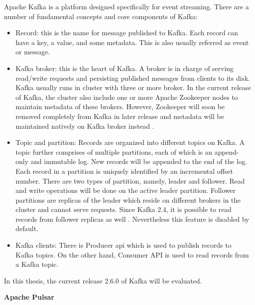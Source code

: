 Apache Kafka is a platform designed specifically for event streaming. There are a number of fundamental concepts and core components of Kafka:
\begin{itemize}
	\item Record: this is the name for message published to Kafka. Each record can have a key, a value, and some metadata. This is also usually referred as event or message.
	\item Kafka broker: this is the heart of Kafka. A broker is in charge of serving read/write requests and persisting published messages from clients to its disk. Kafka usually runs in cluster with three or more broker. In the current release of Kafka, the cluster also include one or more Apache Zookeeper \cite{apachezookeeper} nodes to maintain metadata of these brokers. However, Zookeeper will soon be removed completely from Kafka in later release and metadata will be maintained natively on Kafka broker instead \cite{kafkaremovezookeeper}.
	\item Topic and partition: Records are organized into different topics on Kafka. A topic further comprises of multiple partitions, each of which is an append-only and immutable log. New records will be appended to the end of the log. Each record in a partition is uniquely identified by an incremental offset number. There are two types of partition, namely, leader and follower. Read and write operations will be done on the active leader partition. Follower partitions are replicas of the leader which reside on different brokers in the cluster and cannot serve requests. Since Kafka 2.4, it is possible to read records from follower replicas as well \cite{kafkareadfromfollower}. Nevertheless this feature is disabled by default.
	\item Kafka clients: There is Producer \acrshort{api} which is used to publish records to Kafka topics. On the other hand, Consumer API is used to read records from a Kafka topic. 
\end{itemize}

In this thesis, the current release 2.6.0 of Kafka will be evaluated.

\textbf{Apache Pulsar}

